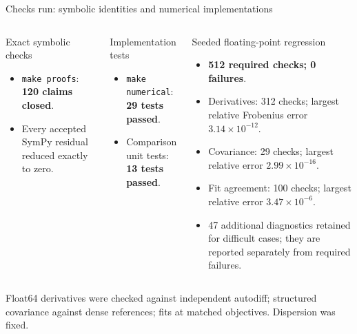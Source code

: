 \documentclass[aspectratio=169,10pt]{beamer}
\begin{document}
\begin{frame}{Checks run: symbolic identities and numerical implementations}
\begin{columns}[T,onlytextwidth]
\begin{block}{Exact symbolic checks}
\begin{itemize}
  \item \texttt{make proofs}: \textbf{120 claims closed}.
  \item Every accepted SymPy residual reduced exactly to zero.
\end{itemize}
\end{block}
\begin{block}{Implementation tests}
\begin{itemize}
  \item \texttt{make numerical}: \textbf{29 tests passed}.
  \item Comparison unit tests: \textbf{13 tests passed}.
\end{itemize}
\end{block}
\begin{block}{Seeded floating-point regression}
\begin{itemize}
  \item \textbf{512 required checks; 0 failures}.
  \item Derivatives: 312 checks; largest relative Frobenius error
        $3.14\times10^{-12}$.
  \item Covariance: 29 checks; largest relative error
        $2.99\times10^{-16}$.
  \item Fit agreement: 100 checks; largest relative error
        $3.47\times10^{-6}$.
  \item 47 additional diagnostics retained for difficult cases; they are
        reported separately from required failures.
\end{itemize}
\end{block}
\end{columns}
\vfill
\scriptsize Float64 derivatives were checked against independent autodiff;
structured covariance against dense references; fits at matched objectives.
Dispersion was fixed.
\end{frame}
\end{document}

